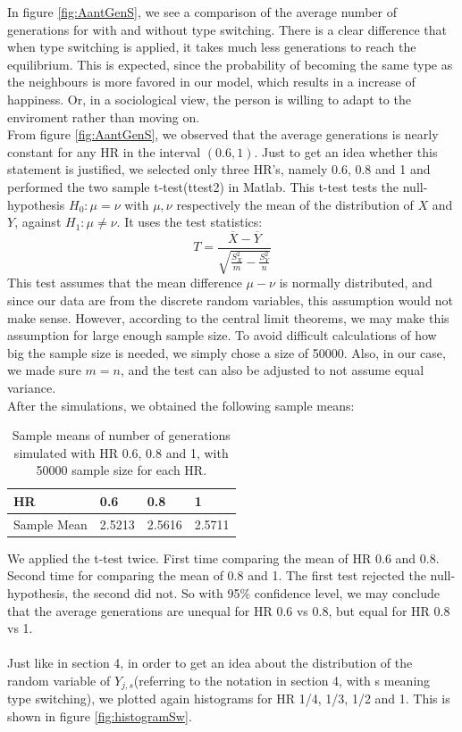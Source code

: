 In figure \ref{fig:AantGenS}, we see a comparison of the average number of generations for with and without type switching. 
There is a clear difference that when type switching is applied, it takes much less generations to reach the equilibrium. 
This is expected, since the probability of becoming the same type as the neighbours is more favored in our model, which results in a increase of happiness. 
Or, in a sociological view, the person is willing to adapt to the enviroment rather than moving on.\\

From figure \ref{fig:AantGenS}, we observed that the average generations is nearly constant for any HR in the interval \((0.6,1)\). 
Just to get an idea whether this statement is justified, we selected only three HR's, namely 0.6, 0.8 and 1 and performed the two sample t-test(ttest2) in Matlab. 
This t-test tests the null-hypothesis $H_0:\mu=\nu$ with $\mu,\nu$ respectively the mean of the distribution of $X$ and $Y$, against $H_1:\mu\neq\nu$. It uses the test statistics:
 \[T=\frac{\overline{X}-\overline{Y}}{\sqrt{\frac{S^2_X}{m}-\frac{S^2_Y}{n}}}\]
This test assumes that the mean difference $\mu-\nu$ is normally distributed, and since our data are from the discrete random variables, this assumption would not make sense. 
However, according to the central limit theorems, we may make this assumption for large enough sample size. 
To avoid difficult calculations of how big the sample size is needed, we simply chose a size of 50000. 
Also, in our case, we made sure $m=n$, and the test can also be adjusted to not assume equal variance.\\

After the simulations, we obtained the following sample means:
\begin{table}[htp]
\centering
\caption{Sample means of number of generations simulated with HR 0.6, 0.8 and 1, with 50000 sample size for each HR.}
\begin{tabular}{|l|l|l|l|}
\hline
 HR&0.6&0.8&1 \\ \hline
 Sample Mean&2.5213&2.5616&2.5711  \\ \hline 
\end{tabular}
\end{table}
We applied the t-test twice. 
First time comparing the mean of HR 0.6 and 0.8. 
Second time for comparing the mean of 0.8 and 1. 
The first test rejected the null-hypothesis, the second did not. 
So with 95\% confidence level, we may conclude that the average generations are unequal for HR 0.6 vs 0.8, but equal for HR 0.8 vs 1.\\
\\
Just like in section 4, in order to get an idea about the distribution of the random variable of $Y_{j,s}$(referring to the notation in section 4, with s meaning type switching), we plotted again histograms for HR 1/4, 1/3, 1/2 and 1. This is shown in figure \ref{fig:histogramSw}.


